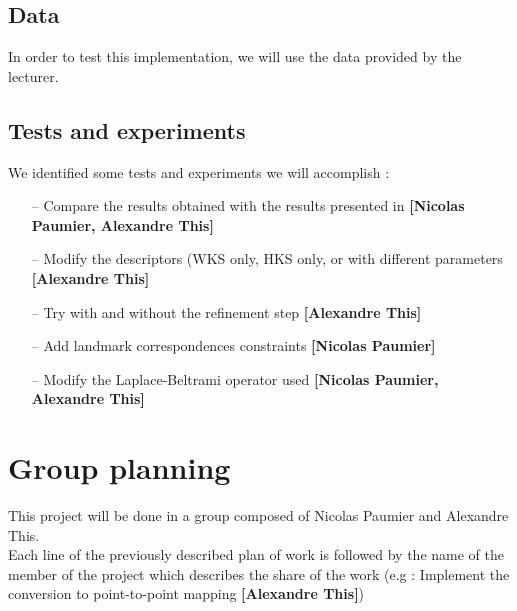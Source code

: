 \documentclass{article}
\begin{document}
\subsection{Data}
In order to test this implementation, we will use the data provided by the lecturer.

\subsection{Tests and experiments}
We identified some tests and experiments we will accomplish :

\begin{itemize}
\item[--]{Compare the results obtained with the results presented in \cite{ovsjanikov2012functional} \textbf{[Nicolas Paumier, Alexandre This]}}
\item[--]{Modify the descriptors (WKS only, HKS only, or with different parameters \textbf{[Alexandre This]}}
\item[--]{Try with and without the refinement step \textbf{[Alexandre This]}}
\item[--]{Add landmark correspondences constraints \textbf{[Nicolas Paumier]}}
\item[--]{Modify the Laplace-Beltrami operator used \textbf{[Nicolas Paumier, Alexandre This]}}
\end{itemize}

\section{Group planning}
This project will be done in a group composed of Nicolas Paumier and Alexandre This. \\

Each line of the previously described plan of work is followed by the name of the member of the project which describes the share of the work (e.g : Implement the conversion to point-to-point mapping \textbf{[Alexandre This]})



\end{document}
